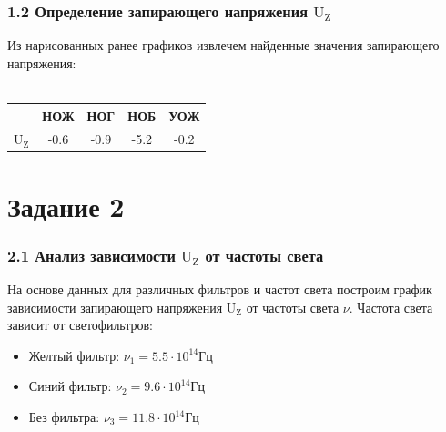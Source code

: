 \documentclass[12pt,openany]{book}
\begin{document}
\newpage

\subsection*{1.2 Определение запирающего напряжения $\text{U}_\text{Z}$}

\vspace{10pt}

\noindent Из нарисованных ранее графиков извлечем найденные значения
запирающего напряжения:\\\\

\begin{center}
    \begin{tabular}{|c|c|c|c|c|}
        \hline
        & НОЖ & НОГ & НОБ & УОЖ \\
        \hline
        $\text{U}_\text{Z}$ & -0.6 & -0.9 & -5.2 & -0.2 \\
        \hline
    \end{tabular}
\end{center}

\chapter*{Задание 2}

\subsection*{2.1  Анализ зависимости $\text{U}_\text{Z}$ от частоты света}

\vspace{10pt}

\noindent На основе данных для различных фильтров и 
частот света построим график зависимости запирающего напряжения 
$\text{U}_\text{Z}$ от частоты света $\nu$. 
Частота света зависит от светофильтров:\\

{
    \begin{itemize}[noitemsep]
        \item Желтый фильтр: $\nu_1 = 5.5 \cdot 10^{14} \text{Гц}$
        \item Синий фильтр: $\nu_2 = 9.6 \cdot 10^{14} \text{Гц}$
        \item Без фильтра: $\nu_3 = 11.8 \cdot 10^{14} \text{Гц}$
    \end{itemize}
}

\vspace{2pt}
\end{document}
